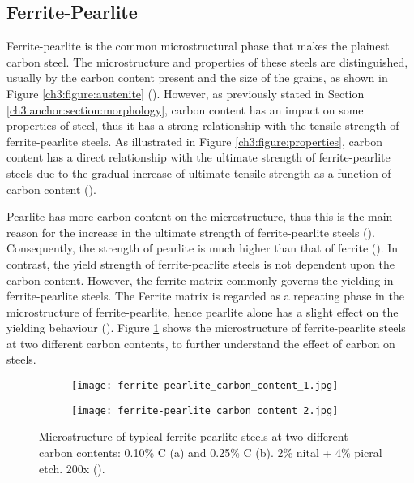 \subsection{Ferrite-Pearlite}
Ferrite-pearlite is the common microstructural phase that makes the plainest carbon steel. The microstructure and properties of these steels are distinguished, usually by the carbon content present and the size of the grains, as shown in Figure \ref{ch3:figure:austenite} (\cite{molabe2018determining}). However, as previously stated in Section \ref{ch3:anchor:section:morphology}, carbon content has an impact on some properties of steel, thus it has a strong relationship with the tensile strength of ferrite-pearlite steels. As illustrated in Figure \ref{ch3:figure:properties}, carbon content has a direct relationship with the ultimate strength of ferrite-pearlite steels due to the gradual increase of ultimate tensile strength as a function of carbon content (\cite{zhao2013effects}).

Pearlite has more carbon content on the microstructure, thus this is the main reason for the increase in the ultimate strength of ferrite-pearlite steels (\cite{bajaj2020steels}). Consequently, the strength of pearlite is much higher than that of ferrite (\cite{molabe2018determining}). In contrast, the yield strength of ferrite-pearlite steels is not dependent upon the carbon content. However, the ferrite matrix commonly governs the yielding in ferrite-pearlite steels. The Ferrite matrix is regarded as a repeating phase in the microstructure of ferrite-pearlite, hence pearlite alone has a slight effect on the yielding behaviour (\cite{molabe2018determining}). Figure \ref{ch3:figure:contents} shows the microstructure of ferrite-pearlite steels at two different carbon contents, to further understand the effect of carbon on steels.

\begin{figure}[H]

\centering
\begin{subfigure}{.45\textwidth}
    \centering
    \texttt{[image: ferrite-pearlite\_carbon\_content\_1.jpg]}
    \caption{}
\end{subfigure}
\begin{subfigure}{.45\textwidth}
    \centering
    \texttt{[image: ferrite-pearlite\_carbon\_content\_2.jpg]}
    \caption{}
\end{subfigure}

\caption{Microstructure of typical ferrite-pearlite steels at two different carbon contents: 0.10\% C (a) and 0.25\% C (b). 2\% nital + 4\% picral etch. 200x (\cite{osei2015foam}).}
\label{ch3:figure:contents}
\end{figure}
 
